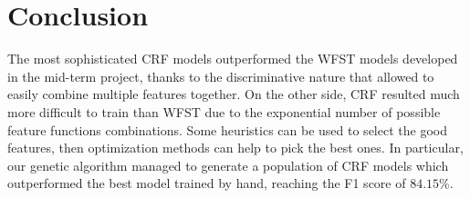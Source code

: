 \section{Conclusion}
\label{sec:conclusion}
The most sophisticated \ac{CRF} models outperformed the \ac{WFST} models developed in the mid-term project, thanks to the discriminative nature that allowed to easily combine multiple features together.
On the other side, \ac{CRF} resulted much more difficult to train than \ac{WFST} due to the exponential number of possible feature functions combinations.
Some heuristics can be used to select the good features, then optimization methods can help to pick the best ones.
In particular, our genetic algorithm managed to generate a population of \ac{CRF} models which outperformed the best model trained by hand, reaching the F1 score of $84.15\%$.
